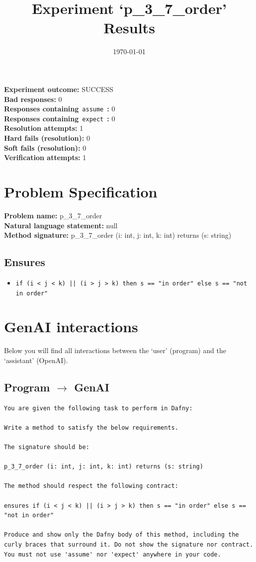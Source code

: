\documentclass{article}
\begin{document}
\title{Experiment `p\_3\_7\_order' Results}
\author{\today}
\date{}
\maketitle
\textbf{Experiment outcome: }SUCCESS
\\\textbf{Bad responses: }0
\\\textbf{Responses containing}~\texttt{assume}~\textbf{: }0
\\\textbf{Responses containing}~\texttt{expect}~\textbf{: }0
\\\textbf{Resolution attempts: }1
\\\textbf{Hard fails (resolution): }0
\\\textbf{Soft fails (resolution): }0
\\\textbf{Verification attempts: }1
\section*{Problem Specification}
\textbf{Problem name: }p\_3\_7\_order
\\\textbf{Natural language statement: }null
\\\textbf{Method signature: }p\_3\_7\_order (i: int, j: int, k: int) returns (s: string)
\subsection*{Ensures}
\begin{itemize}
\item \texttt{if (i < j < k) || (i > j > k) then s == "in order" else s == "not in order"}
\end{itemize}
\clearpage
\section*{GenAI interactions}
Below you will find all interactions between the `user' (program) and the `assistant' (OpenAI).
\subsection*{Program $\rightarrow$ GenAI}
\begin{lstlisting}
You are given the following task to perform in Dafny:

Write a method to satisfy the below requirements.

The signature should be:

p_3_7_order (i: int, j: int, k: int) returns (s: string)

The method should respect the following contract:

ensures if (i < j < k) || (i > j > k) then s == "in order" else s == "not in order"

Produce and show only the Dafny body of this method, including the curly braces that surround it. Do not show the signature nor contract. You must not use 'assume' nor 'expect' anywhere in your code.
\end{lstlisting}
\end{document}
